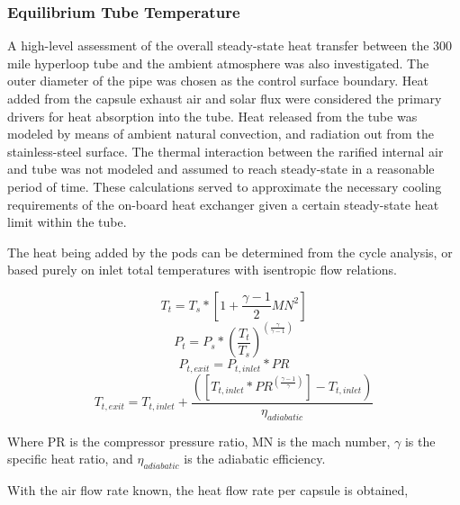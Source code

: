 \documentclass[heading.tex]{subfiles}
\begin{document}
\subsubsection{Equilibrium Tube Temperature}
A high-level assessment of the overall steady-state heat transfer between the 300 mile hyperloop tube and the ambient atmosphere was
also investigated. The outer diameter of the pipe was chosen as the control surface boundary. Heat added from the capsule exhaust air and
solar flux were considered the primary drivers for heat absorption into the tube. Heat released from the tube was modeled by means of
ambient natural convection, and radiation out from the stainless-steel surface. The thermal interaction between the rarified internal air and
tube was not modeled and assumed to reach steady-state in a reasonable period of time. These calculations served to approximate the
necessary cooling requirements of the on-board heat exchanger given a certain steady-state heat limit within the tube.

The heat being added by the pods can be determined from the cycle analysis, or based purely on inlet total temperatures with isentropic
flow relations.

\begin{equation*}
T_{t} = T_{s} * [1 + \frac{\gamma -1}{2} MN^2]
\end{equation*}
\begin{equation*}
P_{t} = P_{s} * (\frac{ T_{t}}{T_{s}})^(\frac{\gamma}{\gamma -1})
\end{equation*}
\begin{equation*}
P_{t,exit} = P_{t,inlet} * PR
\end{equation*}
\begin{equation*}
T_{t,exit} = T_{t,inlet} + \frac{([T_{t,inlet}*PR^{(\frac{\gamma-1}{\gamma})}] - T_{t,inlet})}  {{\eta}_{adiabatic}}
\end{equation*}

Where PR is the compressor pressure ratio, MN is the mach number,  $\gamma$ is the specific heat ratio, and  ${\eta}_{adiabatic}$ is the
adiabatic efficiency.

With the air flow rate known, the heat flow rate per capsule is obtained,
\end{document}
